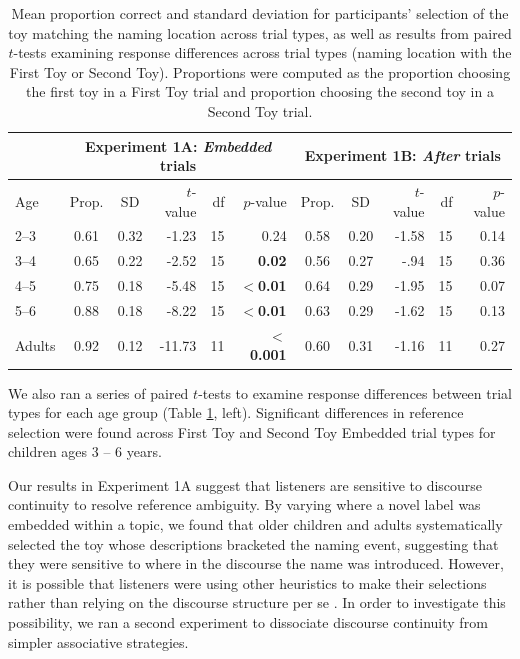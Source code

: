 \documentclass[man]{apa2}
\begin{document}
  \begin{table} [t]
  \caption{Mean proportion correct and standard deviation for participants' selection of the toy matching the naming location across trial types, as well as results from paired $t$-tests examining response differences across trial types (naming location with the First Toy or Second Toy). Proportions were computed as the proportion choosing the first toy in a First Toy trial and proportion choosing the second toy in a Second Toy trial.\label{tab:2} } 
  \begin{center} 
    \begin{tabular}{lccrrr|ccrrr} 
         & \multicolumn{5}{c}{Experiment 1A: {\it Embedded} trials} &  \multicolumn{5}{c}{Experiment 1B: {\it After} trials}\\
                     \hline 
      \null Age & Prop. & SD & $t$-value & df & $p$-value  & Prop. & SD & $t$-value & df & $p$-value  \\ 
      \hline  
       2--3  & 0.61 & 0.32 & -1.23 & 15 & 0.24                          & 0.58 & 0.20 & -1.58 & 15& 0.14\\ 
       3--4  & 0.65 & 0.22 & -2.52 & 15 & \textbf{0.02}            & 0.56 & 0.27 & -.94 & 15 & 0.36 \\ 
       4--5  & 0.75 & 0.18 & -5.48 & 15 & \textbf{$<$0.01}     & 0.64 & 0.29 &-1.95 & 15 & 0.07\\
       5--6  & 0.88 & 0.18 & -8.22 & 15 & \textbf{$<$0.01}      & 0.63 & 0.29  & -1.62 & 15 & 0.13\\ 
       Adults & 0.92 & 0.12 & -11.73 & 11 & \textbf{$<$0.001} & 0.60 & 0.31 & -1.16 & 11 & 0.27 \\
      \hline 
    \end{tabular} 
 \end{center}
\end{table}

We also ran a series of paired $t$-tests to examine response differences between trial types for each age group (Table \ref{tab:2}, left).  Significant differences in reference selection were found across First Toy and Second Toy Embedded trial types for children ages 3 -- 6 years.

Our results in Experiment 1A suggest that listeners are sensitive to discourse continuity to resolve reference ambiguity.  By varying where a novel label was embedded within a topic, we found that older children and adults systematically selected the toy whose descriptions bracketed the naming event, suggesting that they were sensitive to where in the discourse the name was introduced.  However, it is possible that listeners were using other heuristics to make their selections rather than relying on the discourse structure per se \cite{samuelson1998}.  In order to investigate this possibility, we ran a second experiment to dissociate discourse continuity from simpler associative strategies. 
\end{document}

